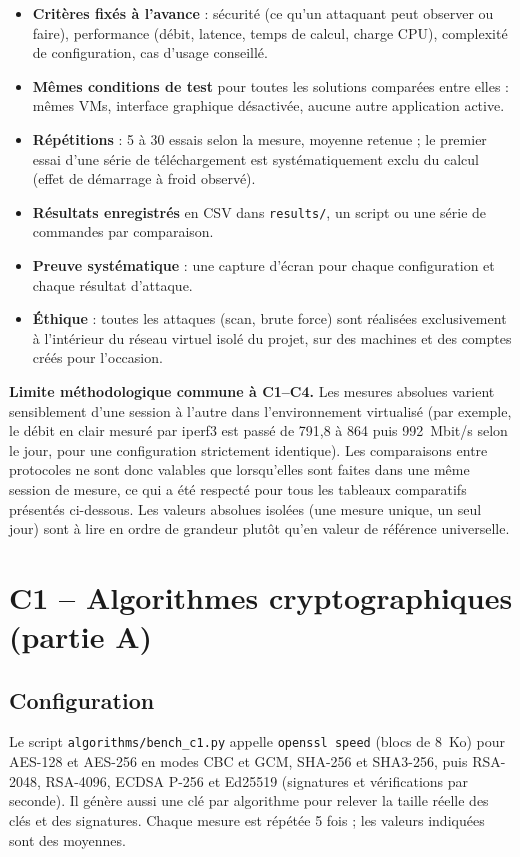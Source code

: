 \documentclass[11pt,a4paper]{article}
\newcommand{\fic}[1]{\texttt{#1}}
\begin{document}
\begin{itemize}
  \item \textbf{Critères fixés à l'avance} : sécurité (ce qu'un attaquant peut observer ou faire),
        performance (débit, latence, temps de calcul, charge CPU), complexité de configuration,
        cas d'usage conseillé.
  \item \textbf{Mêmes conditions de test} pour toutes les solutions comparées entre elles :
        mêmes VMs, interface graphique désactivée, aucune autre application active.
  \item \textbf{Répétitions} : 5 à 30 essais selon la mesure, moyenne retenue ; le premier essai
        d'une série de téléchargement est systématiquement exclu du calcul (effet de démarrage
        à froid observé).
  \item \textbf{Résultats enregistrés} en CSV dans \fic{results/}, un script ou une série de
        commandes par comparaison.
  \item \textbf{Preuve systématique} : une capture d'écran pour chaque configuration et chaque
        résultat d'attaque.
  \item \textbf{Éthique} : toutes les attaques (scan, brute force) sont réalisées exclusivement
        à l'intérieur du réseau virtuel isolé du projet, sur des machines et des comptes créés
        pour l'occasion.
\end{itemize}

\textbf{Limite méthodologique commune à C1--C4.} Les mesures absolues varient sensiblement
d'une session à l'autre dans l'environnement virtualisé (par exemple, le débit en clair mesuré
par iperf3 est passé de 791,8 à 864 puis 992~Mbit/s selon le jour, pour une configuration
strictement identique). Les comparaisons entre protocoles ne sont donc valables que lorsqu'elles
sont faites dans une même session de mesure, ce qui a été respecté pour tous les tableaux
comparatifs présentés ci-dessous. Les valeurs absolues isolées (une mesure unique, un seul jour)
sont à lire en ordre de grandeur plutôt qu'en valeur de référence universelle.

\section{C1 -- Algorithmes cryptographiques (partie A)}

\subsection{Configuration}
Le script \fic{algorithms/bench\_c1.py} appelle \texttt{openssl speed} (blocs de 8~Ko) pour
AES-128 et AES-256 en modes CBC et GCM, SHA-256 et SHA3-256, puis RSA-2048, RSA-4096, ECDSA P-256
et Ed25519 (signatures et vérifications par seconde). Il génère aussi une clé par algorithme pour
relever la taille réelle des clés et des signatures. Chaque mesure est répétée 5 fois ; les valeurs
indiquées sont des moyennes.
\end{document}
